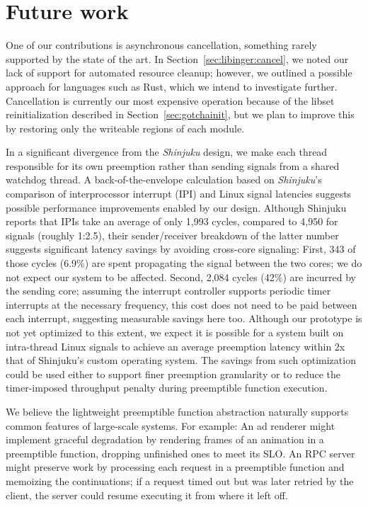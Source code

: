 \section{Future work}

One of our contributions is asynchronous cancellation, something rarely supported by
the state of the art.  In Section~\ref{sec:libinger:cancel}, we noted our lack of
support for automated resource cleanup; however, we outlined a possible approach for
languages such as Rust, which we intend to investigate further.  Cancellation is
currently
our most expensive operation because of the libset reinitialization described in
Section~\ref{sec:gotchainit}, but we plan to improve this by restoring only the
writeable regions of each module.

In a significant divergence from the \textit{Shinjuku} design, we make each thread
responsible for its own preemption rather than sending signals from a shared watchdog
thread.  A back-of-the-envelope calculation based on \textit{Shinjuku}'s comparison of
interprocessor interrupt (IPI) and Linux signal latencies suggests possible
performance improvements enabled by our design.
Although Shinjuku reports that IPIs take an average of only 1,993 cycles, compared to
4,950 for signals (roughly 1:2.5), their sender/receiver breakdown of the latter
number suggests significant latency savings by avoiding cross-core signaling:
First, 343 of those cycles (6.9\%) are spent propagating the signal between the two
cores; we do not expect our system to be affected.  Second, 2,084 cycles (42\%)
are incurred by the sending core; assuming the interrupt controller supports
periodic timer interrupts at the necessary frequency, this cost does not need to be
paid between each interrupt, suggesting measurable savings here too.  Although
our prototype is not yet optimized to this extent, we expect it is possible for a
system built on intra-thread Linux signals to achieve an average preemption latency
within 2x that of Shinjuku's custom operating system.  The savings from such
optimization could be used either to support finer preemption granularity or to
reduce the timer-imposed throughput penalty during preemptible function execution.

We believe the lightweight preemptible function abstraction naturally supports
common features of large-scale systems.  For example:  An ad renderer might implement
graceful degradation by rendering frames of an animation in a preemptible function,
dropping unfinished ones to meet its SLO.  An RPC server might preserve work by
processing each request in a preemptible function and memoizing the continuations; if
a request timed out but was later retried by the client, the server could resume
executing it from where it left off.

